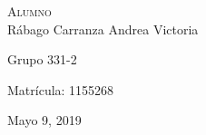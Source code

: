 \documentclass[12pt, letterpaper]{article}
\begin{document}
\begin{titlepage}
{	%
			\large
			\textsc{Alumno}\\
			\large{Rábago Carranza Andrea Victoria} %
	
	
	
	\vfill
	{\large Grupo 331-2}

	{\large Matrícula: 1155268}
	\vfill
	\vfill %
	
	{\large Mayo 9, 2019} %
	
	
	 
	
	\vfill %
}	
\end{titlepage}

\end{document}
